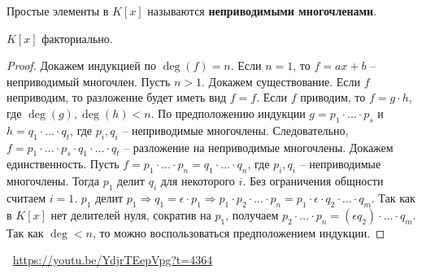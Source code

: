 \begin{definition}
    Простые элементы в $K[x]$ называются \textbf{неприводимыми многочленами}.
\end{definition}
\begin{theorem}
    $K[x]$ факториально.
    \begin{proof}
        Докажем индукцией по $\deg(f) = n$. Если $n = 1$, то $f = ax + b$ -- неприводимый многочлен. Пусть $n > 1$. Докажем существование. Если $f$ неприводим, то разложение будет иметь вид $f = f$. Если $f$ приводим, то $f = g \cdot h$, где $\deg(g), \deg(h) < n$. По предположению индукции $g = p_1 \cdot ... \cdot p_s$ и $h = q_1 \cdot ... \cdot q_t$, где $p_i, q_i$ -- неприводимые многочлены. Следовательно, $f = p_1 \cdot ... \cdot p_s \cdot q_1 \cdot ... \cdot q_t$ -- разложение на неприводимые многочлены. Докажем единственность. Пусть $f = p_1 \cdot ... \cdot p_n = q_1 \cdot ... \cdot q_n$, где $p_i, q_i$ -- неприводимые многочлены. Тогда $p_1$ делит $q_i$ для некоторого $i$. Без ограничения общности считаем $i = 1$. $p_1$ делит $p_1 \Rightarrow q_1 = \epsilon \cdot p_1 \Rightarrow p_1 \cdot p_2 \cdot ... \cdot p_n = p_1 \cdot \epsilon \cdot q_2 \cdot ... \cdot q_m$. Так как в $K[x]$ нет делителей нуля, сократив на $p_1$, получаем $p_2 \cdot ... \cdot p_n = (\epsilon q_2) \cdot ... \cdot q_m$. Так как $\deg < n$, то можно воспользоваться предположением индукции.
    \end{proof}
\end{theorem}
\large \faYoutube \normalsize $\>$ \url{https://youtu.be/YdjrTEepVpg?t=4364}